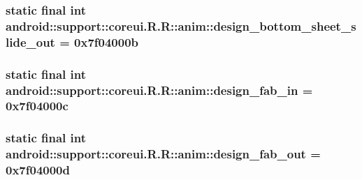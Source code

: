\hypertarget{classandroid_1_1support_1_1coreui_1_1_r_1_1anim_16d060ded6d3d692030b2e31b5fa6cd8}{
\subsubsection[{design\_\-bottom\_\-sheet\_\-slide\_\-out}]{\setlength{\rightskip}{0pt plus 5cm}static final int android::support::coreui.R.R::anim::design\_\-bottom\_\-sheet\_\-slide\_\-out = 0x7f04000b}}
\label{classandroid_1_1support_1_1coreui_1_1_r_1_1anim_16d060ded6d3d692030b2e31b5fa6cd8}


\hypertarget{classandroid_1_1support_1_1coreui_1_1_r_1_1anim_ba714aa0a6c22310402638daf50f9f71}{
\subsubsection[{design\_\-fab\_\-in}]{\setlength{\rightskip}{0pt plus 5cm}static final int android::support::coreui.R.R::anim::design\_\-fab\_\-in = 0x7f04000c}}
\label{classandroid_1_1support_1_1coreui_1_1_r_1_1anim_ba714aa0a6c22310402638daf50f9f71}


\hypertarget{classandroid_1_1support_1_1coreui_1_1_r_1_1anim_11ae41e80f58e6d63adf68441f88cf53}{
\subsubsection[{design\_\-fab\_\-out}]{\setlength{\rightskip}{0pt plus 5cm}static final int android::support::coreui.R.R::anim::design\_\-fab\_\-out = 0x7f04000d}}
\label{classandroid_1_1support_1_1coreui_1_1_r_1_1anim_11ae41e80f58e6d63adf68441f88cf53}


